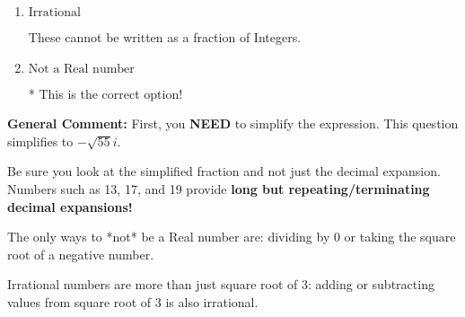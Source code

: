 \documentclass{extbook}[14pt]
\begin{document}
\begin{enumerate}
{\begin{enumerate}[label=\Alph*.]
These are the counting numbers with 0 (0, 1, 2, 3, ...)
\item \( \text{Irrational} \)

These cannot be written as a fraction of Integers.
\item \( \text{Not a Real number} \)

* This is the correct option!
\end{enumerate}

\textbf{General Comment:} First, you \textbf{NEED} to simplify the expression. This question simplifies to $-\sqrt{55} i$. 
 
 Be sure you look at the simplified fraction and not just the decimal expansion. Numbers such as 13, 17, and 19 provide \textbf{long but repeating/terminating decimal expansions!} 
 
 The only ways to *not* be a Real number are: dividing by 0 or taking the square root of a negative number. 
 
 Irrational numbers are more than just square root of 3: adding or subtracting values from square root of 3 is also irrational.
}
\end{enumerate}
\end{document}
